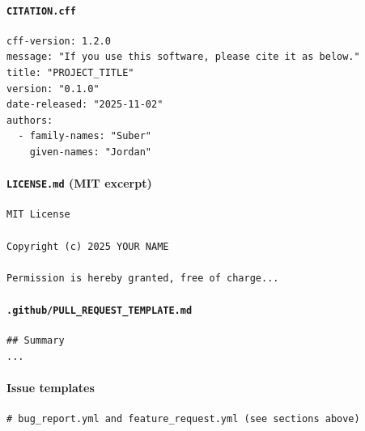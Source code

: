 \documentclass[11pt]{article}
\newcommand{\file}[1]{\texttt{#1}}
\begin{document}
\paragraph{\file{CITATION.cff}}
\begin{verbatim}
cff-version: 1.2.0
message: "If you use this software, please cite it as below."
title: "PROJECT_TITLE"
version: "0.1.0"
date-released: "2025-11-02"
authors:
  - family-names: "Suber"
    given-names: "Jordan"
\end{verbatim}

\paragraph{\file{LICENSE.md} (MIT excerpt)}
\begin{verbatim}
MIT License

Copyright (c) 2025 YOUR NAME

Permission is hereby granted, free of charge...
\end{verbatim}

\paragraph{\file{.github/PULL\_REQUEST\_TEMPLATE.md}}
\begin{verbatim}
## Summary
...
\end{verbatim}

\paragraph{Issue templates}
\begin{verbatim}
# bug_report.yml and feature_request.yml (see sections above)
\end{verbatim}
\end{document}

